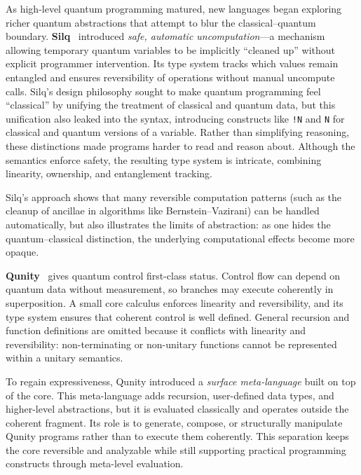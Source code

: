 As high-level quantum programming matured, new languages began exploring richer quantum abstractions that attempt to blur the classical–quantum boundary. 
\textbf{Silq}~\cite{silq} introduced \emph{safe, automatic uncomputation}---a mechanism allowing temporary quantum variables to be implicitly “cleaned up” without explicit programmer intervention. 
Its type system tracks which values remain entangled and ensures reversibility of operations without manual uncompute calls. 
Silq’s design philosophy sought to make quantum programming feel “classical” by unifying the treatment of classical and quantum data, but this unification also leaked into the syntax, introducing constructs like \texttt{!N} and \texttt{N} for classical and quantum versions of a variable. 
Rather than simplifying reasoning, these distinctions made programs harder to read and reason about. 
Although the semantics enforce safety, the resulting type system is intricate, combining linearity, ownership, and entanglement tracking.

Silq’s approach shows that many reversible computation patterns (such as the cleanup of ancillae in algorithms like Bernstein–Vazirani) can be handled automatically, but also illustrates the limits of abstraction: as one hides the quantum–classical distinction, the underlying computational effects become more opaque.


\textbf{Qunity}~\cite{qunity:Voichick_2023} gives quantum control first-class status.  
Control flow can depend on quantum data without measurement, so branches may execute coherently in superposition.  
A small core calculus enforces linearity and reversibility, and its type system ensures that coherent control is well defined.  
General recursion and function definitions are omitted because it conflicts with linearity and reversibility: non-terminating or non-unitary functions cannot be represented within a unitary semantics.  

To regain expressiveness, Qunity introduced a \emph{surface meta-language} built on top of the core\cite{compiling_qunity_2025}.  
This meta-language adds recursion, user-defined data types, and higher-level abstractions, but it is evaluated classically and operates outside the coherent fragment.  
Its role is to generate, compose, or structurally manipulate Qunity programs rather than to execute them coherently.  
This separation keeps the core reversible and analyzable while still supporting practical programming constructs through meta-level evaluation.

